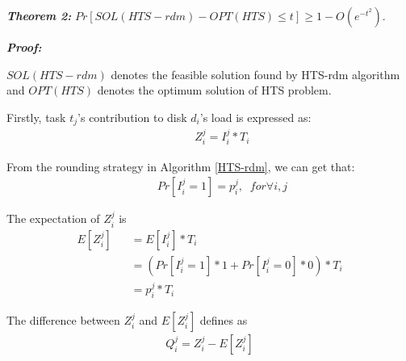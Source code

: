 \documentclass[conference]{IEEEtran}
\begin{document}
\emph{\textbf{Theorem 2:}} $Pr[SOL(HTS-rdm) - OPT(HTS) \leq t] \geq 1 - O(e^{-t^2})$.

\emph{\textbf{Proof:}}

$SOL(HTS-rdm)$ denotes the feasible solution found by HTS-rdm algorithm and  $OPT(HTS)$ denotes the optimum solution of HTS problem.

Firstly, task $t_j$'s contribution to disk $d_i$'s load is expressed as:
 \begin{align}
&\;\;\;\;\;Z_i^j = I_i^j*T_i
\end{align}

From the rounding strategy in Algorithm \ref{HTS-rdm}, we can get that:
 \begin{align}
&\;\;\;\;\;Pr[I_i^j = 1] = p_i^j,\;\;for\forall i,j \nonumber
\end{align}

The expectation of $Z_i^j$ is
\begin{align}
E[Z_i^j] &\;\;\;= E[I_i^j]*T_i \nonumber\\
&\;\;\;= (Pr[I_i^j = 1] * 1 + Pr[I_i^j = 0] * 0)*T_i \nonumber\\
&\;\;\;= p_i^j*T_i\label{prove:expect}
\end{align}

The difference between $Z_i^j$ and $E[Z_i^j]$ defines as
\begin{align}
Q_i^j = Z_i^j - E[Z_i^j]\label{prove:diff}
\end{align}
\end{document}
